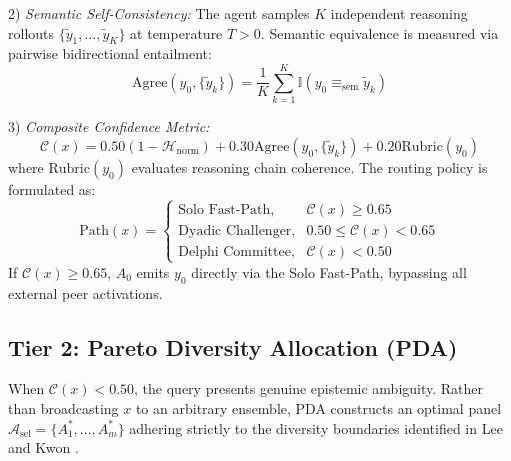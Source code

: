 \documentclass[conference]{IEEEtran}
\begin{document}
2) \textit{Semantic Self-Consistency:} The agent samples $K$ independent reasoning rollouts $\{\tilde{y}_1, \dots, \tilde{y}_K\}$ at temperature $T > 0$. Semantic equivalence is measured via pairwise bidirectional entailment:
\begin{equation}
\text{Agree}(y_0, \{\tilde{y}_k\}) = \frac{1}{K} \sum_{k=1}^K \mathbb{I}\left(y_0 \equiv_{\text{sem}} \tilde{y}_k\right)
\end{equation}

3) \textit{Composite Confidence Metric:}
\begin{equation}
\mathcal{C}(x) = 0.50 \left(1 - \mathcal{H}_{\text{norm}}\right) + 0.30 \text{Agree}(y_0, \{\tilde{y}_k\}) + 0.20 \text{Rubric}(y_0)
\end{equation}
where $\text{Rubric}(y_0)$ evaluates reasoning chain coherence. The routing policy is formulated as:
\begin{equation}
\text{Path}(x) = 
\begin{cases}
\text{Solo Fast-Path}, & \mathcal{C}(x) \ge 0.65 \\
\text{Dyadic Challenger}, & 0.50 \le \mathcal{C}(x) < 0.65 \\
\text{Delphi Committee}, & \mathcal{C}(x) < 0.50
\end{cases}
\end{equation}
If $\mathcal{C}(x) \ge 0.65$, $A_0$ emits $y_0$ directly via the Solo Fast-Path, bypassing all external peer activations.

\subsection{Tier 2: Pareto Diversity Allocation (PDA)}
When $\mathcal{C}(x) < 0.50$, the query presents genuine epistemic ambiguity. Rather than broadcasting $x$ to an arbitrary ensemble, PDA constructs an optimal panel $\mathcal{A}_{\text{sel}} = \{A_1^*, \dots, A_m^*\}$ adhering strictly to the diversity boundaries identified in Lee and Kwon \cite{lee2026}. 
\end{document}
